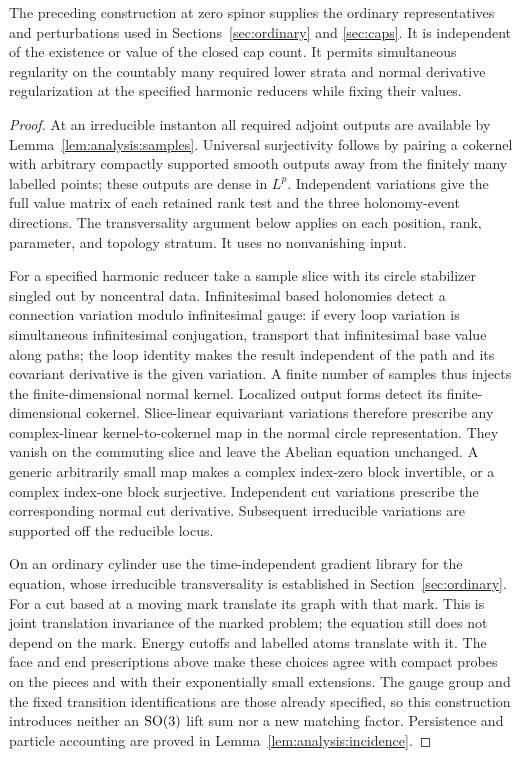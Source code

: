 \begin{proposition}
\label{prop:analysis:ordinary-library}
The preceding construction at zero spinor supplies the ordinary
representatives and perturbations used in Sections~\ref{sec:ordinary}
and \ref{sec:caps}.  It is independent of the existence or value of the
closed cap count.  It permits simultaneous regularity on the countably
many required lower strata and normal derivative regularization at the
specified harmonic reducers while fixing their values.
\end{proposition}
\begin{proof}
At an irreducible instanton all required adjoint outputs are available
by Lemma~\ref{lem:analysis:samples}.  Universal surjectivity follows by
pairing a cokernel with arbitrary compactly supported smooth outputs
away from the finitely many labelled points; these outputs are dense
in $L^p$.  Independent variations give the full value matrix of each
retained rank test and the three holonomy-event directions.  The
transversality argument below applies on each position, rank, parameter,
and topology stratum.  It uses no nonvanishing input.

For a specified harmonic reducer take a sample slice with its circle
stabilizer singled out by noncentral data.  Infinitesimal based
holonomies detect a connection variation modulo infinitesimal gauge:
if every loop variation is simultaneous infinitesimal conjugation,
transport that infinitesimal base value along paths; the loop identity
makes the result independent of the path and its covariant derivative
is the given variation.  A finite number of samples thus injects the
finite-dimensional normal kernel.  Localized output forms detect its
finite-dimensional cokernel.  Slice-linear equivariant variations
therefore prescribe any complex-linear kernel-to-cokernel map in the
normal circle representation.  They vanish on the commuting slice and
leave the Abelian equation unchanged.  A generic arbitrarily small map
makes a complex index-zero block invertible, or a complex index-one
block surjective.  Independent cut variations prescribe the corresponding
normal cut derivative.  Subsequent irreducible variations are supported
off the reducible locus.

On an ordinary cylinder use the time-independent gradient library for
the equation, whose irreducible transversality is established in
Section~\ref{sec:ordinary}.  For a cut based at a moving mark translate
its graph with that mark.  This is joint translation invariance of the
marked problem; the equation still does not depend on the mark.
Energy cutoffs and labelled atoms translate with it.  The face and end
prescriptions above make these choices agree with compact probes on
the pieces and with their exponentially small extensions.  The gauge
group and the fixed transition identifications are those already
specified, so this construction introduces neither an $\operatorname{SO}(3)$ lift
sum nor a new matching factor.  Persistence and particle accounting
are proved in Lemma~\ref{lem:analysis:incidence}.
\end{proof}

